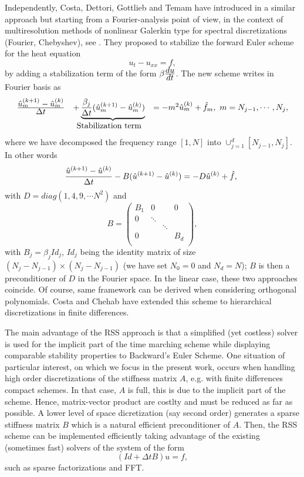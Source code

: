 {Independently, Costa, Dettori, Gottlieb and Temam have introduced in
\cite{BCostaPHD,CDGT} a similar approach but starting from a
Fourier-analysis point of view, in the context of multiresolution methods of
nonlinear Galerkin type for spectral discretizations (Fourier,
Chebyshev), see \cite{TemamIDS}. They proposed to stabilize the forward Euler scheme for
the heat equation
$$
u_t -u_{xx}=f,
$$
by adding a stabilization term of the form $\beta\frac{\textstyle du} {\textstyle dt}$. The
new scheme writes in Fourier basis as
\begin{equation}
\begin{array}{lcl}
\frac{\textstyle {\hat u}^{(k+1)}_m-{\hat u}^{(k)}_m} {\textstyle \Delta t}& +\underbrace{\frac{\textstyle \beta_j} {\textstyle \Delta t}({\hat u}^{(k+1)}_m-{\hat u}^{(k)}_m)}
&=-m^2{\hat u}^{(k)}_m + {\hat f}_m, \ m=N_{j-1}, \cdots, N_{j},\\
 & \mbox{Stabilization term}& \\
 \end{array}
\end{equation}
where we have decomposed the frequency range $[1,N]$ into $\displaystyle{\cup_{j=1}^{d}[N_{j-1},N_{j}]}$. In other words
$$
\frac{\textstyle {\hat u}^{(k+1)}-{\hat u}^{(k)}} {\textstyle \Delta t} -B({\hat u}^{(k+1)}-{\hat u}^{(k)})
=-D{\hat u}^{(k)} + {\hat f}, \
$$
with $D=diag(1,4,9, \cdots N^2)$ and 
$$
B=
\left(
\begin{array}{llll}
B_1 & 0 & & 0\\
0 & \ddots &  & \\
 & & \ddots &   \\
 0 & &  & B_d\\
\end{array}
\right),
$$
with $B_j=\beta_j Id_j$, $Id_j$ being the identity matrix of size $(N_{j}-N_{j-1}) \times (N_{j}- N_{j-1})$ (we have set $N_0=0$ and $N_d=N$);
$B$ is then a preconditioner of $D$ in the Fourier space. In the linear case, these two approaches coincide. Of course, same framework can be derived when considering orthogonal polynomials.
Costa and Chehab \cite{ChehabCosta1,ChehabCosta2} have
extended this scheme to hierarchical discretizations in finite
differences.


The main advantage of the RSS approach is that a simplified (yet costless) solver is used for the implicit part of the time marching scheme while displaying comparable stability properties to Backward's Euler Scheme. One situation of particular interest, on which we focus in the present work, occurs when handling high order discretizations of the stiffness matrix $A$, e.g. with  finite differences compact schemes. In that case,  $A$ is full, this is due to the implicit part of the scheme. Hence, matrix-vector product are costlty and must be reduced as far as possible.  A lower level of space dicretization (say second order) generates a sparse stiffness matrix $B$ which is a natural efficient preconditioner of $A$.  Then, the RSS scheme can be implemented efficiently taking advantage of the existing  (sometimes fast) solvers of the system of the form 
$$
(Id +\Delta t B) u=f,
$$
such as sparse factorizations and FFT.

}

